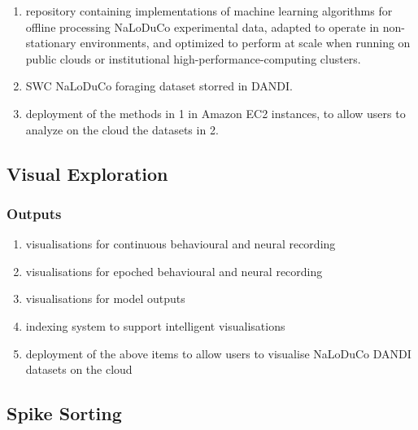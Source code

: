 \documentclass[12pt]{article}
\begin{document}
\begin{enumerate}

    \item repository containing implementations of machine learning algorithms
        for offline processing NaLoDuCo experimental data, adapted to operate
        in non-stationary environments, and optimized to perform at scale when
        running on public clouds or institutional
        high-performance-computing clusters.

    \item SWC NaLoDuCo foraging dataset storred in DANDI.

    \item deployment of the methods in 1 in Amazon EC2 instances, to allow
        users to analyze on the cloud the datasets in 2.

\end{enumerate}

\subsection{Visual Exploration}
\label{sec:visualExploration}

\subsubsection{Outputs}

\begin{enumerate}

    \item visualisations for continuous behavioural and neural recording

    \item visualisations for epoched behavioural and neural recording

    \item visualisations for model outputs

    \item indexing system to support intelligent visualisations

    \item deployment of the above items to allow users to visualise NaLoDuCo
        DANDI datasets on the cloud

\end{enumerate}

\subsection{Spike Sorting}
\end{document}

